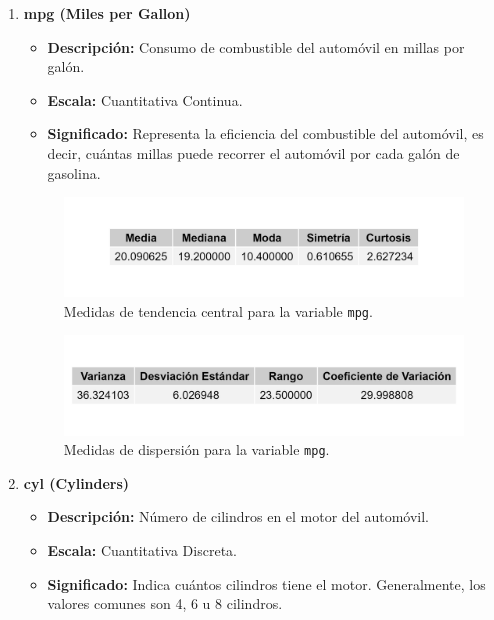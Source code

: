 \documentclass{article}
\begin{document}
\begin{enumerate}
    \item \textbf{mpg (Miles per Gallon)}

          \begin{itemize}
              \item \textbf{Descripción:} Consumo de combustible del automóvil en millas por galón.
              \item \textbf{Escala:} Cuantitativa Continua.
              \item \textbf{Significado:} Representa la eficiencia del combustible del automóvil, es decir, cuántas millas puede recorrer el automóvil por cada galón de gasolina.
          \end{itemize}
          
          \begin{figure}[H]
              \centering
              \includegraphics[width=\textwidth]{MTC/mpg_central.png}
              \caption{Medidas de tendencia central para la variable \texttt{mpg}.}
              \label{fig:mpg_central}
          \end{figure}
          
          \begin{figure}[H]
              \centering
              \includegraphics[width=\textwidth]{MTC/mpg_dispersion.png}
              \caption{Medidas de dispersión para la variable \texttt{mpg}.}
              \label{fig:mpg_dispersion}
          \end{figure}

    \item \textbf{cyl (Cylinders)}

          \begin{itemize}
              \item \textbf{Descripción:} Número de cilindros en el motor del automóvil.
              \item \textbf{Escala:} Cuantitativa Discreta.
              \item \textbf{Significado:} Indica cuántos cilindros tiene el motor. Generalmente, los valores comunes son 4, 6 u 8 cilindros.
          \end{itemize}
          

\end{enumerate}
\end{document}
